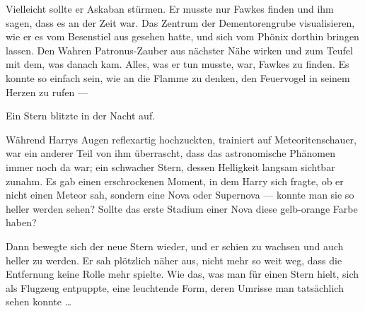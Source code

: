 Vielleicht sollte er Askaban stürmen. Er musste nur Fawkes finden und ihm sagen, dass es an der Zeit war. Das Zentrum der Dementorengrube visualisieren, wie er es vom Besenstiel aus gesehen hatte, und sich vom Phönix dorthin bringen lassen. Den Wahren Patronus-Zauber aus nächster Nähe wirken und zum Teufel mit dem, was danach kam.
Alles, was er tun musste, war, Fawkes zu finden.
Es konnte so einfach sein, wie an die Flamme zu denken, den Feuervogel in seinem Herzen zu rufen —

Ein Stern blitzte in der Nacht auf.

Während Harrys Augen reflexartig hochzuckten, trainiert auf Meteoritenschauer, war ein anderer Teil von ihm überrascht, dass das astronomische Phänomen immer noch da war; ein schwacher Stern, dessen Helligkeit langsam sichtbar zunahm. Es gab einen erschrockenen Moment, in dem Harry sich fragte, ob er nicht einen Meteor sah, sondern eine Nova oder Supernova — konnte man sie so heller werden sehen? Sollte das erste Stadium einer Nova diese gelb-orange Farbe haben?

Dann bewegte sich der neue Stern wieder, und er schien zu wachsen und auch heller zu werden. Er sah plötzlich näher aus, nicht mehr so weit weg, dass die Entfernung keine Rolle mehr spielte. Wie das, was man für einen Stern hielt, sich als Flugzeug entpuppte, eine leuchtende Form, deren Umrisse man tatsächlich sehen konnte …

